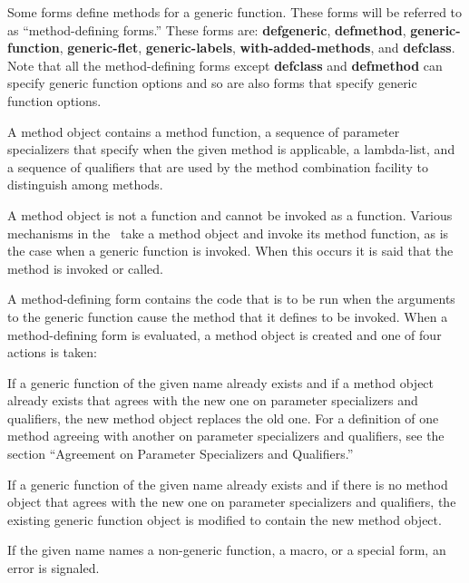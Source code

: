 Some forms define methods for a generic function.  These forms will be
referred to as ``method-defining forms.'' These forms are: {\bf
defgeneric}, {\bf defmethod}, {\bf generic-function}, {\bf
generic-flet}, {\bf generic-labels}, {\bf with-added-methods}, and
{\bf defclass}. Note that all the method-defining forms except {\bf
defclass} and {\bf defmethod} can specify generic function options and
so are also forms that specify generic function options.

\endsubSection%


A method object contains a method function, a sequence of {\bit
parameter specializers\/} that specify when the given method is
applicable, a lambda-list, and a sequence of {\bit qualifiers\/} that
are used by the method combination facility to distinguish among
methods.

A method object is not a function and cannot be invoked as a function. 
Various mechanisms in the \OS\ take a method object and invoke its method
function, as is the case when a generic function is invoked.  When this
occurs it is said that the method is invoked or called.

A method-defining form contains the code that is to be run when the
arguments to the generic function cause the method that it defines to
be invoked.  When a method-defining form is evaluated, a method object
is created and one of four actions is taken:

\beginlist

\item{\bull} If a generic function of the given name already exists
and if a method object already exists that agrees with the new one on
parameter specializers and qualifiers, the new method object replaces
the old one.  For a definition of one method agreeing with another on
parameter specializers and qualifiers, see the section 
``Agreement on Parameter Specializers and Qualifiers.''

\item{\bull} If a generic function of the given name already exists
and if there is no method object that agrees with the new one on
parameter specializers and qualifiers, the existing generic function
object is modified to contain the new method object.

\item{\bull} If the given name names a non-generic function, a macro,
or a special form, an error is signaled.

